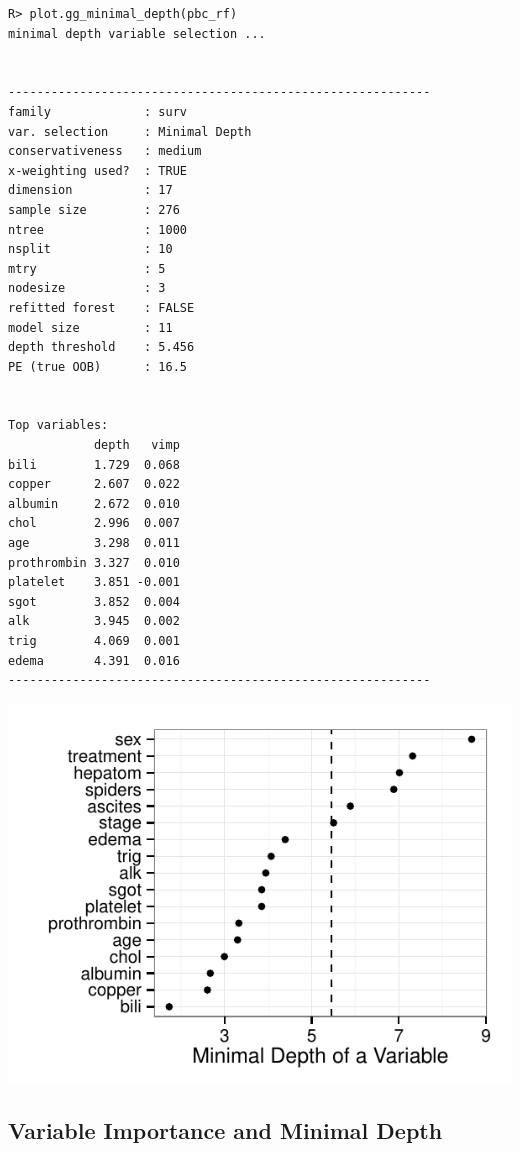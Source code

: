 \documentclass[nojss]{jss}\usepackage[]{graphicx}\usepackage[]{color}
\makeatletter
\def\maxwidth{ %
  \ifdim\Gin@nat@width>\linewidth
    \linewidth
  \else
    \Gin@nat@width
  \fi
}
\newenvironment{kframe}{%
 \def\at@end@of@kframe{}%
 \ifinner\ifhmode%
  \def\at@end@of@kframe{\end{minipage}}%
  \begin{minipage}{\columnwidth}%
 \fi\fi%
 \def\FrameCommand##1{\hskip\@totalleftmargin \hskip-\fboxsep
 \colorbox{shadecolor}{##1}\hskip-\fboxsep
     \hskip-\linewidth \hskip-\@totalleftmargin \hskip\columnwidth}%
 \MakeFramed {\advance\hsize-\width
   \@totalleftmargin\z@ \linewidth\hsize
   \@setminipage}}%
 {\par\unskip\endMakeFramed%
 \at@end@of@kframe}
\newenvironment{knitrout}{}{} %
\makeatother
\begin{document}
\begin{knitrout}\footnotesize
{}\color{fgcolor}\begin{kframe}
\begin{verbatim}
R> plot.gg_minimal_depth(pbc_rf)
minimal depth variable selection ...


-----------------------------------------------------------
family             : surv 
var. selection     : Minimal Depth 
conservativeness   : medium 
x-weighting used?  : TRUE 
dimension          : 17 
sample size        : 276 
ntree              : 1000 
nsplit             : 10 
mtry               : 5 
nodesize           : 3 
refitted forest    : FALSE 
model size         : 11 
depth threshold    : 5.456 
PE (true OOB)      : 16.5 


Top variables:
            depth   vimp
bili        1.729  0.068
copper      2.607  0.022
albumin     2.672  0.010
chol        2.996  0.007
age         3.298  0.011
prothrombin 3.327  0.010
platelet    3.851 -0.001
sgot        3.852  0.004
alk         3.945  0.002
trig        4.069  0.001
edema       4.391  0.016
-----------------------------------------------------------
\end{verbatim}
\end{kframe}

{\centering \includegraphics[width=\maxwidth]{figure/beamer-pbc-mindepth-1} 

}



\end{knitrout}


\subsection{Variable Importance and Minimal Depth}
\end{document}
